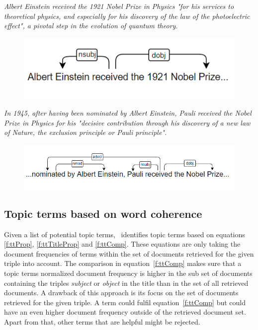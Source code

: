 \textit{Albert Einstein received the 1921 Nobel Prize in Physics "for his services to theoretical physics,
 and especially for his discovery of the law of the photoelectric effect", a pivotal step in the 
 evolution of quantum theory.}
 
 \begin{figure}[H]
    \centering
    \captionsetup{justification=centering}
    \includegraphics[width=.5\textwidth]{Dependency_4.png}
    \label{Statement1}
\end{figure}

\textit{In 1945, after having been nominated by Albert Einstein, Pauli received the Nobel Prize in Physics 
for his "decisive contribution through his discovery of a new law of Nature, the exclusion principle 
or Pauli principle".}

\begin{figure}[H]
    \centering
    \captionsetup{justification=centering}
    \includegraphics[width=.5\textwidth]{Dependency_2.png}
    \label{Statement2}
\end{figure}

\subsection{Topic terms based on word coherence}

Given a list of potential topic terms, \DeFacto\ identifies topic terms based on equations \ref{f:ttProp}, \ref{f:ttTitleProp} and \ref{f:ttComp}. These equations are only taking the document frequencies of terms within the set of documents retrieved for the given triple into account. The comparison in equation~\ref{f:ttComp} makes sure that a topic terms normalized document frequency is higher in the sub set of documents containing the triples \textit{subject} or \textit{object} in the title than in the set of all retrieved documents. A drawback of this approach is its focus on the set of documents retrieved for the given triple. A term could fulfil equation~\ref{f:ttComp} but could have an even higher document frequency outside of the retrieved document set. Apart from that, other terms that are helpful might be rejected.

